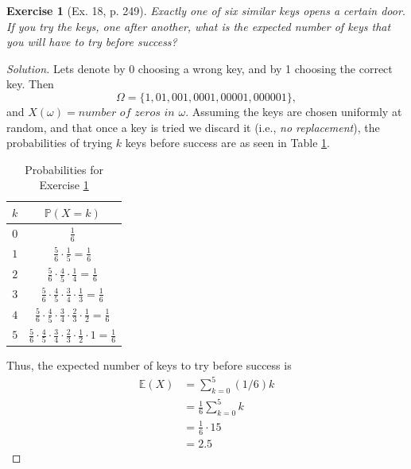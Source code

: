 \documentclass[letterpaper, 10 pt, conference]{article}
\newtheorem{ex}{Exercise}
\newcommand\E{\ensuremath{\mathbb{E}}}
\renewcommand{\P}{\ensuremath{\mathbb{P}}}
\newcommand\Om{\ensuremath{\Omega}}
\newcommand{\w}{\ensuremath{\omega}}
\begin{document}
\begin{ex}[Ex. 18, p. 249]\label{ex:keys}
Exactly one of six similar keys opens a certain door. If you try the keys, one after another, what is the expected number of keys that you will have to try before success?
\end{ex}
\begin{proof}[Solution]
Lets denote by 0 choosing a wrong key, and by 1 choosing the correct key. Then 
\begin{equation}
\Om = \lbrace 1, 01, 001, 0001, 00001, 000001 \rbrace,
\end{equation}
and $X(\w) = \textit{number of zeros in } \w$. Assuming the keys are chosen uniformly at random, and that once a key is tried we discard it (i.e., \textit{no replacement}), the probabilities of trying $k$ keys before success are as seen in Table \ref{tab:ex3}.

\begin{table}
\centering
\begin{tabular}{|c|c|}
	\hline
	$k$ & $\P(X = k)$ \\
	\hline
	$0$ & $\frac{1}{6}$ \\
	\hline
	$1$ & $\frac{5}{6} \cdot \frac{1}{5} = \frac{1}{6}$ \\
	\hline
	$2$ &  $\frac{5}{6} \cdot \frac{4}{5} \cdot \frac{1}{4} = \frac{1}{6}$ \\
	\hline
	$3$ & $\frac{5}{6} \cdot \frac{4}{5} \cdot \frac{3}{4} \cdot \frac{1}{3} = \frac{1}{6}$ \\
	\hline
	$4$ & $\frac{5}{6} \cdot \frac{4}{5} \cdot \frac{3}{4} \cdot \frac{2}{3} \cdot \frac{1}{2} = \frac{1}{6}$  \\
	\hline
	$5$ & $\frac{5}{6} \cdot \frac{4}{5} \cdot \frac{3}{4} \cdot \frac{2}{3} \cdot \frac{1}{2} \cdot 1 = \frac{1}{6}$ \\
	\hline
\end{tabular}
\caption{Probabilities for Exercise \ref{ex:keys}}
\label{tab:ex3}
\end{table}


Thus, the expected number of keys to try before success is
\begin{align}
	\E(X) &= \sum_{k = 0}^{5} (1/6) k\\
	&= \frac{1}{6} \sum_{k = 0}^{5} k\\
	&= \frac{1}{6} \cdot 15 \\
	&= 2.5
\end{align}
\end{proof}
\end{document}
